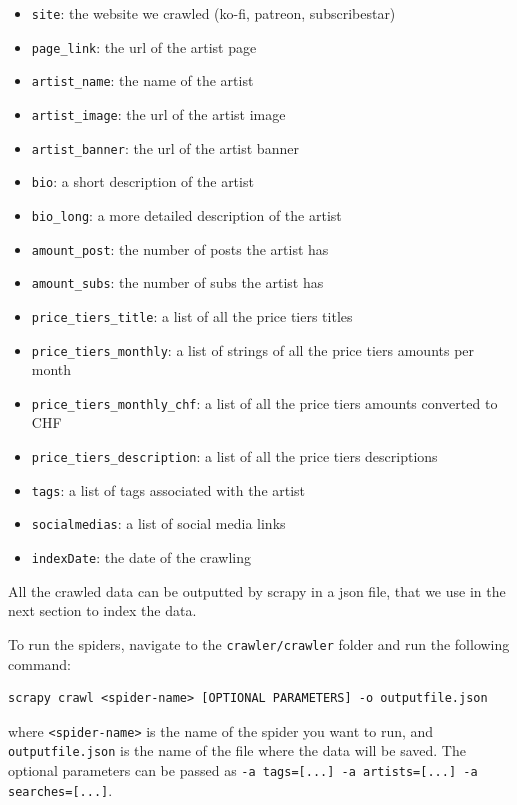 \documentclass[tikz,14pt]{article}
\begin{document}
\begin{itemize}
    \item \texttt{site}: the website we crawled (ko-fi, patreon, subscribestar)
    \item \texttt{page_link}: the url of the artist page
    \item \texttt{artist_name}: the name of the artist
    \item \texttt{artist_image}: the url of the artist image
    \item \texttt{artist_banner}: the url of the artist banner
    \item \texttt{bio}: a short description of the artist
    \item \texttt{bio_long}: a more detailed description of the artist
    \item \texttt{amount_post}: the number of posts the artist has
    \item \texttt{amount_subs}: the number of subs the artist has
    \item \texttt{price_tiers_title}: a list of all the price tiers titles
    \item \texttt{price_tiers_monthly}: a list of strings of all the price tiers amounts per month
    \item \texttt{price_tiers_monthly_chf}: a list of all the price tiers amounts converted to CHF
    \item \texttt{price_tiers_description}: a list of all the price tiers descriptions
    \item \texttt{tags}: a list of tags associated with the artist
    \item \texttt{socialmedias}: a list of social media links
    \item \texttt{indexDate}: the date of the crawling
\end{itemize}

All the crawled data can be outputted by scrapy in a json file, that we use in the next section to index the data.

To run the spiders, navigate to the \texttt{crawler/crawler} folder and run the following command:
\begin{verbatim}
scrapy crawl <spider-name> [OPTIONAL PARAMETERS] -o outputfile.json
\end{verbatim} 
where \texttt{<spider-name>} is the name of the spider you want to run,
and \texttt{outputfile.json} is the name of the file where the data will be saved.
The optional parameters can be passed as \texttt{-a tags=[...] -a artists=[...] -a searches=[...]}.
\end{document}

